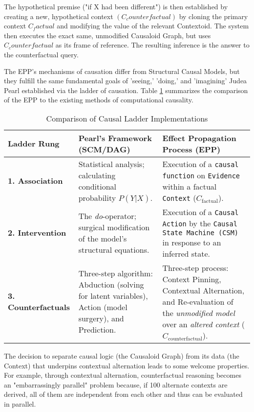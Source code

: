 The hypothetical premise ("if X had been different") is then established by creating a new, hypothetical context $(C_counterfactual)$ by cloning the primary context $C_factual$ and modifying the value of the relevant Contextoid. The system then executes the exact same, unmodified Causaloid Graph, but uses $C_counterfactual$ as its frame of reference. The resulting inference is the answer to the counterfactual query. 


The EPP's mechanisms of causation differ from Structural Causal Models, 
but they fulfill the same fundamental goals of 'seeing,' 'doing,' and 'imagining' Judea Pearl established
via the ladder of causation. Table \ref{tab:ladder_comparison} summarizes the comparison of the EPP to the existing methods of computational causality.
 

\begin{table}[h!]
\centering
\caption{Comparison of Causal Ladder Implementations}
\label{tab:ladder_comparison}
\begin{tabular}{|l|p{5.5cm}|p{5.5cm}|}
\hline
\textbf{Ladder Rung} & \textbf{Pearl's Framework (SCM/DAG)} & \textbf{Effect Propagation Process (EPP)} \\
\hline
\textbf{1. Association} &
Statistical analysis; calculating conditional probability $P(Y|X)$. &
Execution of a \texttt{causal function} on \texttt{Evidence} within a factual \texttt{Context} ($C_{\text{factual}}$). \\
\hline
\textbf{2. Intervention} &
The \textit{do}-operator; surgical modification of the model's structural equations. &
Execution of a \texttt{Causal Action} by the \texttt{Causal State Machine (CSM)} in response to an inferred state. \\
\hline
\textbf{3. Counterfactuals} &
Three-step algorithm: Abduction (solving for latent variables), Action (model surgery), and Prediction. &
Three-step process: Context Pinning, Contextual Alternation, and Re-evaluation of the \textit{unmodified model} over an \textit{altered context} ($C_{\text{counterfactual}}$). \\
\hline
\end{tabular}
\end{table}

The decision to separate causal logic (the Causaloid Graph) from its data (the Context) that underpins
contextual alternation leads to some welcome properties. For example, through contextual alternation,  counterfactual reasoning becomes an "embarrassingly parallel" problem because, if 100 alternate contexts are derived, all of them are independent from each other and thus can be evaluated in parallel. 


